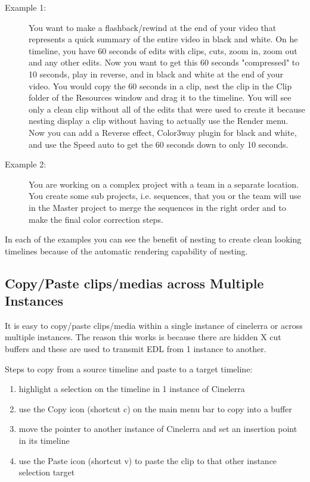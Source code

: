 \begin{description}
    \item[Example 1:] You want to make a flashback/rewind at the end of your video
that represents a quick summary of the entire video in black and white. On
he timeline, you have 60 seconds of edits with clips, cuts, zoom in, zoom
out and any other edits. Now you want to get this 60 seconds "compressed"
to 10 seconds, play in reverse, and in black and white at the end of your
    video.    
    You would copy the 60 seconds in a clip, nest the clip in the Clip folder
of the Resources window and drag it to the timeline. You will see only a
clean clip without all of the edits that were used to create it because
nesting display a clip without having to actually use the Render menu.
    Now you can add a Reverse effect, Color3way plugin for black and white, and
use the Speed auto to get the 60 seconds down to only 10 seconds.
    \item[Example 2:] You are working on a complex project with a team in a separate
location. You create some sub projects, i.e. sequences, that you or the
team will use in the Master project to merge the sequences in the right
order and to make the final color correction steps.
\end{description}

In each of the examples you can see the benefit of nesting to create clean
looking timelines because of the automatic rendering capability of nesting.

\subsection{Copy/Paste clips/medias across Multiple Instances}%
\label{sub:copy_paste_multiple_instances}

It is easy to copy/paste clips/media within a single instance of cinelerra or across multiple instances.  The reason this works is because there are hidden X cut buffers and these are used to transmit EDL from 1 instance to another.

\noindent Steps to copy from a source timeline and paste to a target timeline:

\begin{enumerate}
    \item highlight a selection on the timeline in 1 instance of Cinelerra
    \item use the Copy icon (shortcut c)  on the main menu bar to copy into a buffer
    \item move the pointer to another instance of Cinelerra and set an insertion point in its timeline
    \item use the Paste icon (shortcut v) to paste the clip to that other instance selection target
\end{enumerate}

